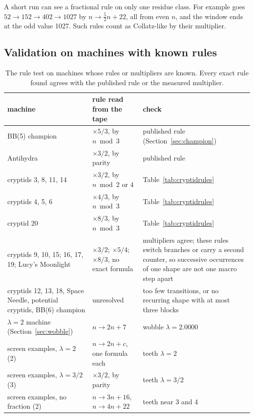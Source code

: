 \documentclass[11pt,a4paper]{article}
\newcommand{\tm}[1]{\texttt{\detokenize{#1}}}   %
\newcommand{\BB}[1]{BB(#1)}
\begin{document}
A short run can see a fractional rule on only one residue class. For example
\tm{1RB---_1RC0RA_1LD0RB_0LE0LC_1RA0LE} goes $52 \to 152 \to 402 \to 1027$ by
$n \to \tfrac52 n + 22$, all from even $n$, and the window ends at the odd value 1027. Such rules
count as Collatz-like by their multiplier.

\subsection{Validation on machines with known rules}
\begin{table}[h]
\centering\small
\begin{tabular}{@{}p{4.3cm}p{4.4cm}p{5.4cm}@{}}
\toprule
machine & rule read from the tape & check \\
\midrule
\BB{5} champion & $\times5/3$, by $n \bmod 3$ & published rule (Section~\ref{sec:champion})\\
Antihydra & $\times3/2$, by parity & published rule\\
cryptids 3, 8, 11, 14 & $\times3/2$, by $n \bmod 2$ or $4$ & Table~\ref{tab:cryptidrules}\\
cryptids 4, 5, 6 & $\times4/3$, by $n \bmod 3$ & Table~\ref{tab:cryptidrules}\\
cryptid 20 & $\times8/3$, by $n \bmod 3$ & Table~\ref{tab:cryptidrules}\\
cryptids 9, 10, 15; 16, 17, 19; Lucy's Moonlight & $\times3/2$; $\times5/4$; $\times8/3$, no
exact formula & multipliers agree; these rules switch branches or carry a second counter, so
successive occurrences of one shape are not one macro step apart\\
cryptids 12, 13, 18, Space Needle, potential cryptids, \BB{6} champion & unresolved & too few
transitions, or no recurring shape with at most three blocks\\
$\lambda = 2$ machine (Section~\ref{sec:wobble}) & $n \to 2n + 7$ & wobble $\lambda = 2.0000$\\
screen examples, $\lambda = 2$ (2) & $n \to 2n + c$, one formula each & teeth $\lambda = 2$\\
screen examples, $\lambda = 3/2$ (3) & $\times3/2$, by parity & teeth $\lambda = 3/2$\\
screen examples, no fraction (2) & $n \to 3n+16$, $n \to 4n + 22$ & teeth near 3 and 4\\
\bottomrule
\end{tabular}
\caption{The rule test on machines whose rules or multipliers are known. Every exact rule found
agrees with the published rule or the measured multiplier.}
\label{tab:rulecheck}
\end{table}
\end{document}
